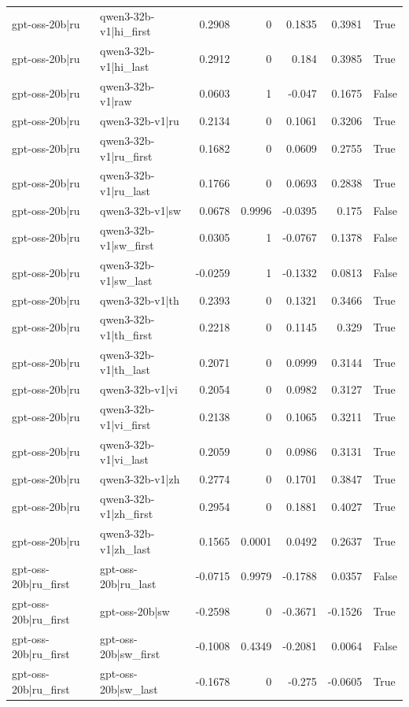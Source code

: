 \begin{table}
\begin{tabular}{l l r r r r l}
gpt-oss-20b|ru & qwen3-32b-v1|hi_first & 0.2908 & 0 & 0.1835 & 0.3981 & True \\
gpt-oss-20b|ru & qwen3-32b-v1|hi_last & 0.2912 & 0 & 0.184 & 0.3985 & True \\
gpt-oss-20b|ru & qwen3-32b-v1|raw & 0.0603 & 1 & -0.047 & 0.1675 & False \\
gpt-oss-20b|ru & qwen3-32b-v1|ru & 0.2134 & 0 & 0.1061 & 0.3206 & True \\
gpt-oss-20b|ru & qwen3-32b-v1|ru_first & 0.1682 & 0 & 0.0609 & 0.2755 & True \\
gpt-oss-20b|ru & qwen3-32b-v1|ru_last & 0.1766 & 0 & 0.0693 & 0.2838 & True \\
gpt-oss-20b|ru & qwen3-32b-v1|sw & 0.0678 & 0.9996 & -0.0395 & 0.175 & False \\
gpt-oss-20b|ru & qwen3-32b-v1|sw_first & 0.0305 & 1 & -0.0767 & 0.1378 & False \\
gpt-oss-20b|ru & qwen3-32b-v1|sw_last & -0.0259 & 1 & -0.1332 & 0.0813 & False \\
gpt-oss-20b|ru & qwen3-32b-v1|th & 0.2393 & 0 & 0.1321 & 0.3466 & True \\
gpt-oss-20b|ru & qwen3-32b-v1|th_first & 0.2218 & 0 & 0.1145 & 0.329 & True \\
gpt-oss-20b|ru & qwen3-32b-v1|th_last & 0.2071 & 0 & 0.0999 & 0.3144 & True \\
gpt-oss-20b|ru & qwen3-32b-v1|vi & 0.2054 & 0 & 0.0982 & 0.3127 & True \\
gpt-oss-20b|ru & qwen3-32b-v1|vi_first & 0.2138 & 0 & 0.1065 & 0.3211 & True \\
gpt-oss-20b|ru & qwen3-32b-v1|vi_last & 0.2059 & 0 & 0.0986 & 0.3131 & True \\
gpt-oss-20b|ru & qwen3-32b-v1|zh & 0.2774 & 0 & 0.1701 & 0.3847 & True \\
gpt-oss-20b|ru & qwen3-32b-v1|zh_first & 0.2954 & 0 & 0.1881 & 0.4027 & True \\
gpt-oss-20b|ru & qwen3-32b-v1|zh_last & 0.1565 & 0.0001 & 0.0492 & 0.2637 & True \\
gpt-oss-20b|ru_first & gpt-oss-20b|ru_last & -0.0715 & 0.9979 & -0.1788 & 0.0357 & False \\
gpt-oss-20b|ru_first & gpt-oss-20b|sw & -0.2598 & 0 & -0.3671 & -0.1526 & True \\
gpt-oss-20b|ru_first & gpt-oss-20b|sw_first & -0.1008 & 0.4349 & -0.2081 & 0.0064 & False \\
gpt-oss-20b|ru_first & gpt-oss-20b|sw_last & -0.1678 & 0 & -0.275 & -0.0605 & True \\

\end{tabular}
\end{table}
